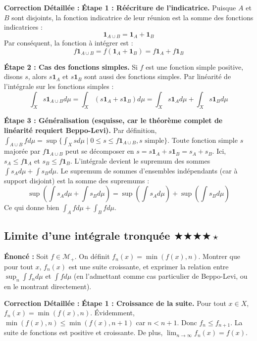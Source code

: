 \documentclass[11pt,a4paper]{article}
\begin{document}
\textbf{Correction D\'etaill\'ee :}
\textbf{Étape 1 : R\'e\'ecriture de l'indicatrice.}
Puisque $A$ et $B$ sont disjoints, la fonction indicatrice de leur r\'eunion est la somme des fonctions indicatrices :
$$\mathbf{1}_{A \cup B} = \mathbf{1}_A + \mathbf{1}_B$$
Par cons\'equent, la fonction \`a int\'egrer est :
$$f \mathbf{1}_{A \cup B} = f (\mathbf{1}_A + \mathbf{1}_B) = f \mathbf{1}_A + f \mathbf{1}_B$$

\textbf{Étape 2 : Cas des fonctions simples.}
Si $f$ est une fonction simple positive, disons $s$, alors $s \mathbf{1}_A$ et $s \mathbf{1}_B$ sont aussi des fonctions simples.
Par lin\'earit\'e de l'int\'egrale sur les fonctions simples :
$$\int_X s \mathbf{1}_{A \cup B} d\mu = \int_X (s \mathbf{1}_A + s \mathbf{1}_B) d\mu = \int_X s \mathbf{1}_A d\mu + \int_X s \mathbf{1}_B d\mu$$

\textbf{Étape 3 : G\'en\'eralisation (esquisse, car le th\'eor\`eme complet de lin\'earit\'e requiert Beppo-Levi).}
Par d\'efinition, $\int_{A \cup B} f d\mu = \sup \{ \int_X s d\mu \mid 0 \le s \le f \mathbf{1}_{A \cup B}, s \text{ simple} \}$.
Toute fonction simple $s$ major\'ee par $f \mathbf{1}_{A \cup B}$ peut se d\'ecomposer en $s = s \mathbf{1}_A + s \mathbf{1}_B = s_A + s_B$.
Ici, $s_A \le f \mathbf{1}_A$ et $s_B \le f \mathbf{1}_B$.
L'int\'egrale devient le supremum des sommes $\int s_A d\mu + \int s_B d\mu$.
Le supremum de sommes d'ensembles ind\'ependants (car \`a support disjoint) est la somme des supremums :
$$\sup (\int s_A d\mu + \int s_B d\mu) = \sup (\int s_A d\mu) + \sup (\int s_B d\mu)$$
Ce qui donne bien $\int_A f d\mu + \int_B f d\mu$.


\subsection*{Limite d'une int\'egrale tronqu\'ee \quad $\bigstar\bigstar\bigstar\bigstar\star$}

\textbf{Énonc\'e :}
Soit $f \in \mathcal{M}_+$. On d\'efinit $f_n(x) = \min(f(x), n)$.
Montrer que pour tout $x$, $f_n(x)$ est une suite croissante, et exprimer la relation entre $\sup_n \int f_n d\mu$ et $\int f d\mu$ (en l'admettant comme cas particulier de Beppo-Levi, ou en le montrant directement).

\textbf{Correction D\'etaill\'ee :}
\textbf{Étape 1 : Croissance de la suite.}
Pour tout $x \in X$, $f_n(x) = \min(f(x), n)$.
Évidemment, $\min(f(x), n) \le \min(f(x), n+1)$ car $n < n+1$.
Donc $f_n \le f_{n+1}$. La suite de fonctions est positive et croissante.
De plus, $\lim_{n \to \infty} f_n(x) = f(x)$.
\end{document}

